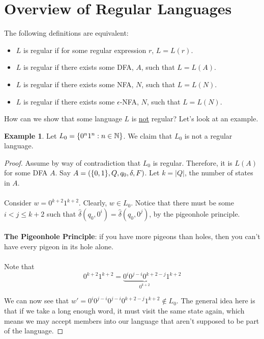 \documentclass[]{article}
\DeclarePairedDelimiter{\set}{\lbrace}{\rbrace}
\theoremstyle{definition}
\newtheorem{ex}{Example}[section]
\newcommand{\lecture}[1]{\marginpar{{\footnotesize $\leftarrow$ \underline{#1}}}}
\begin{document}
      \section{Overview of Regular Languages} \lecture{October 3, 2013}
        The following definitions are equivalent:
        \begin{itemize}
          \item $L$ is regular if for some regular expression $r$, $L = L(r)$.
          \item $L$ is regular if there exists some DFA, $A$, such that $L = L(A)$.
          \item $L$ is regular if there exists some NFA, $N$, such that $L = L(N)$.
          \item $L$ is regular if there exists some $\epsilon$-NFA, $N$, such that $L = L(N)$.
        \end{itemize}

        How can we show that some language $L$ is \underline{not} regular? Let's look at an example.
        \begin{ex}
          Let $L_0 = \set{ 0^n1^n : n \in \mathbb{N} }$. We claim that $L_0$ is not a regular language.

          \begin{proof}
            Assume by way of contradiction that $L_0$ is regular. Therefore, it is $L(A)$ for some DFA $A$. Say $A = (\set{0, 1}, Q, q_0, \delta, F)$. Let $k = |Q|$, the number of states in $A$.
            \\ \\
            Consider $w = 0^{k + 2}1^{k + 2}$. Clearly, $w \in L_0$. Notice that there must be some $i < j \le k + 2$ such that $\hat{\delta}(q_0, 0^i) = \hat{\delta}(q_0, 0^j)$, by the pigeonhole principle.
            \\ \\
            \textbf{The Pigeonhole Principle}: if you have more pigeons than holes, then you can't have every pigeon in its hole alone.
            \\ \\
            Note that
            $$
            0^{k + 2}1^{k+2} = \underbrace{0^i 0^{j - i}0^{k + 2 - j}}_{0^{k+2}} 1^{k+2}
            $$

            We can now see that $w' = 0^i 0^{j - i} 0^{j - i} 0^{k + 2 - j}1^{k + 2} \not \in L_0$. The general idea here is that if we take a long enough word, it must visit the same state again, which means we may accept members into our language that aren't supposed to be part of the language.
          \end{proof}
        \end{ex}
\end{document}
